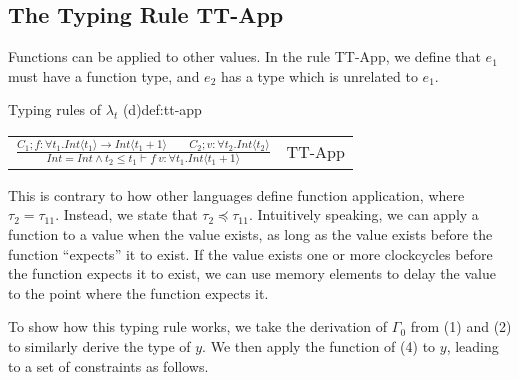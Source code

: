 \begin{prooftree}
\end{prooftree}

\subsection{The Typing Rule TT-App}
Functions can be applied to other values.
In the rule TT-App, we define that $e_1$ must have a function type, and $e_2$ has a type which is unrelated to $e_1$.
\begin{definitiontitled}{Typing rules of $\lambda_t$ (d)}{def:tt-app}
\centering
\begin{tabular}{l l}
$ \displaystyle
  \frac{  C_1; f : \forall t_1. \textit{Int}\langle t_1 \rangle \rightarrow \textit{Int}\langle t_1 + 1 \rangle \quad \quad C_2; v : \forall t_2. \textit{Int}\langle t_2 \rangle
  } {     \textit{Int} = \textit{Int} \land t_2 \leq t_1 \vdash f \: v : \forall t_1. \textit{Int}\langle t_1 + 1 \rangle } 
$ 
& TT-App \\
\end{tabular} 
\end{definitiontitled}

This is contrary to how other languages define function application, where $\tau_2 = \tau_{11}$.
Instead, we state that $\tau_2 \preceq \tau_{11}$.
Intuitively speaking, we can apply a function to a value when the value exists, as long as the value exists before the function ``expects'' it to exist.
If the value exists one or more clockcycles before the function expects it to exist, we can use memory elements to delay the value to the point where the function expects it.

To show how this typing rule works, we take the derivation of $\Gamma_0$ from {\scriptsize (1)} and {\scriptsize (2)} to similarly derive the type of $y$.
We then apply the function of {\scriptsize (4)} to $y$, leading to a set of constraints as follows.
\begin{prooftree}
\end{prooftree}

